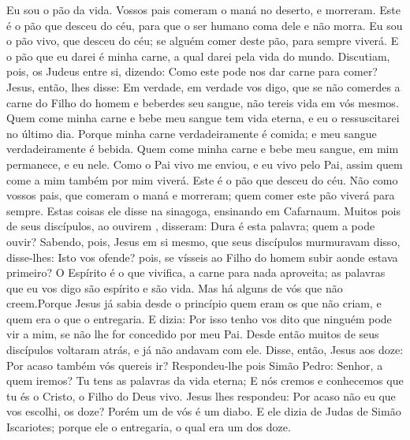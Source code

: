 {Eu sou o pão da vida.
Vossos pais comeram o maná no deserto, e morreram.
Este é o pão que desceu do céu, para que o ser humano coma dele e não morra.
Eu sou o pão vivo, que desceu do céu; se alguém comer deste pão, para sempre viverá. E o pão que eu darei é minha carne, a qual darei pela vida do mundo.
Discutiam, pois, os Judeus entre si, dizendo: Como este pode nos dar
{} carne para comer?
Jesus, então, lhes disse: Em verdade, em verdade vos digo, que se não comerdes a carne do Filho do homem e beberdes seu sangue, não tereis vida em vós mesmos.
Quem come minha carne e bebe meu sangue tem vida eterna, e eu o ressuscitarei no último dia.
Porque minha carne verdadeiramente é comida; e meu sangue verdadeiramente é bebida.
Quem come minha carne e bebe meu sangue, em mim permanece, e eu nele.
Como o Pai vivo me enviou, e eu vivo pelo Pai, assim quem come a mim também por mim viverá.
Este é o pão que desceu do céu. Não como vossos pais, que comeram o maná e morreram; quem comer este pão viverá para sempre.
Estas coisas ele disse na sinagoga, ensinando em Cafarnaum.
Muitos pois de seus discípulos, ao ouvirem
{} , disseram: Dura é esta palavra; quem a pode ouvir?
Sabendo, pois, Jesus em si mesmo, que seus discípulos murmuravam disso, disse-lhes: Isto vos ofende?
 pois, se vísseis ao Filho do homem subir aonde estava primeiro?
O Espírito é o que vivifica, a carne para nada aproveita; as palavras que eu vos digo são espírito e são vida.
Mas há alguns de vós que não creem.Porque Jesus já sabia desde o princípio quem eram os que não criam, e quem era o que o entregaria.
E dizia: Por isso tenho vos dito que ninguém pode vir a mim, se não lhe for concedido por meu Pai.
Desde então muitos de seus discípulos voltaram atrás, e já não andavam com ele.
Disse, então, Jesus aos doze: Por acaso também vós quereis ir?
Respondeu-lhe pois Simão Pedro: Senhor, a quem iremos? Tu tens as palavras da vida eterna;
E nós cremos e conhecemos que tu és o Cristo, o Filho do Deus vivo.
Jesus lhes respondeu: Por acaso não
{} eu que vos escolhi, os doze? Porém um de vós é um diabo.
E ele dizia
{} de Judas de Simão Iscariotes; porque ele o entregaria, o qual era um dos doze.

}
